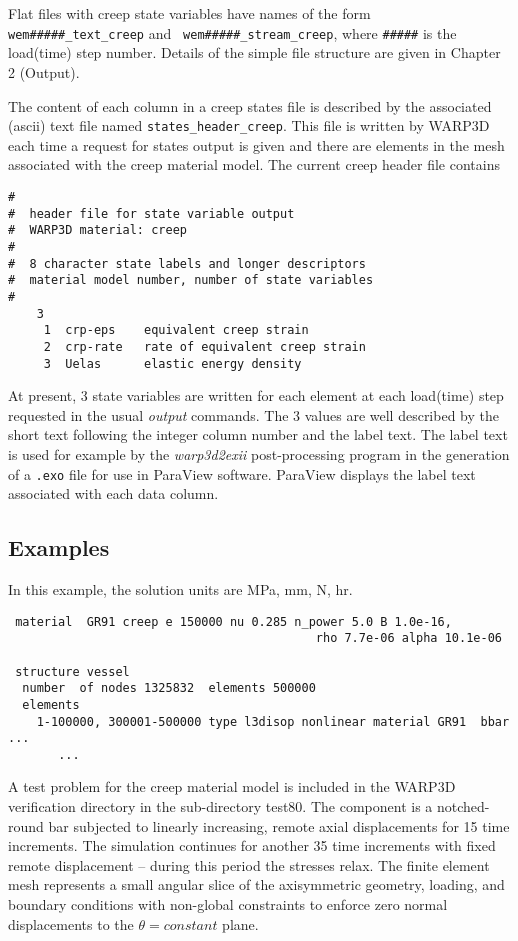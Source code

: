 \documentclass[11pt]{report}
\numberwithin{equation}{section}
\newcommand{\ttt} {\texttt}  %
\newcommand{\ti}{\emph}
\newcommand{\noi}{\noindent}
\begin{document}
Flat files with creep state variables have names of the form \small{\ttt{ wem\#\#\#\#\#\_text\_creep}}
\normalsize and  \small{\ttt{ wem\#\#\#\#\#\_stream\_creep}}, \normalsize 
where \verb|#####| is the load(time) step number.
Details of the simple file structure are given in Chapter 2 (Output).

The content of each column in a creep states file is described by the associated (ascii) text file named  
\small{\ttt{states\_header\_creep}}\normalsize. This file is written by
WARP3D each time a request for states output is given and there are elements in the
mesh associated with the creep material model.  The current creep header file contains

\small
\begin{verbatim}
#
#  header file for state variable output
#  WARP3D material: creep  
#
#  8 character state labels and longer descriptors
#  material model number, number of state variables 
#
    3
     1  crp-eps    equivalent creep strain
     2  crp-rate   rate of equivalent creep strain
     3  Uelas      elastic energy density
\end{verbatim}
\normalsize 
 
\noi At present, 3 state variables are written for each element at each load(time) step requested
in the usual \ti{output} commands. The 3 values are well described by the short text following the 
integer column number and the label text. The label text is used for example by the \ti{warp3d2exii}
post-processing program in the generation of a \ttt{.exo} file for use in ParaView software. ParaView
displays the label text associated with each data column.  

\subsection{Examples}
In this example, the solution units are
MPa, mm, N, hr.

\small
\begin{verbatim}
 material  GR91 creep e 150000 nu 0.285 n_power 5.0 B 1.0e-16,
                                           rho 7.7e-06 alpha 10.1e-06 

 structure vessel
  number  of nodes 1325832  elements 500000
  elements
    1-100000, 300001-500000 type l3disop nonlinear material GR91  bbar ...
       ...
\end{verbatim}
\small

A test problem for the creep material model is included in the WARP3D 
verification directory in the sub-directory test80. The component is a notched-round
bar subjected to linearly increasing, remote axial displacements for 15 time increments.
The simulation continues for another 35 time increments with fixed remote displacement
-- during this period the stresses relax. The finite element mesh represents a 
small angular slice of the axisymmetric
geometry, loading, and boundary conditions with non-global constraints to enforce zero
normal displacements to the $\theta=constant$ plane.
\end{document}
